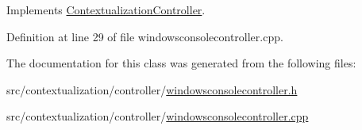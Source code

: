 Implements \mbox{\hyperlink{classContextualizationController_a121919886590cd4955bbcc2d8b747b26}{Contextualization\+Controller}}.



Definition at line 29 of file windowsconsolecontroller.\+cpp.



The documentation for this class was generated from the following files\+:\begin{DoxyCompactItemize}
\item 
src/contextualization/controller/\mbox{\hyperlink{windowsconsolecontroller_8h}{windowsconsolecontroller.\+h}}\item 
src/contextualization/controller/\mbox{\hyperlink{windowsconsolecontroller_8cpp}{windowsconsolecontroller.\+cpp}}\end{DoxyCompactItemize}
